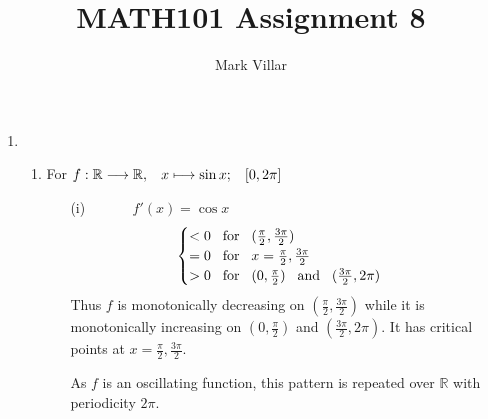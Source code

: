 \documentclass[12pt]{amsart}
\title{MATH101 Assignment 8}
\author{Mark Villar}
\begin{document}
 

\maketitle 

\begin{enumerate}
	
	\item 
	
		\begin{enumerate}
		
			\item  For $f: \mathbb{R} \longrightarrow \mathbb{R}, \hspace{0.3cm} x \longmapsto \sin x; 					\hspace{0.3cm} [0,2\pi]$
				\begin{enumerate}
					\item[(i)] $\text{ } \hspace{1cm} f'(x) = \cos x$
						\begin{align}
							\begin{cases}
								< 0 \hspace{0.3cm} \text{for} \hspace{0.3cm} (\frac{\pi}{2}, 
								\frac{3\pi}{2}) \notag \\
								= 0 \hspace{0.3cm} \text{for} \hspace{0.3cm} x=\frac{\pi}{2}, 
								\frac{3\pi}{2} \notag \\
								> 0 \hspace{0.3cm} \text{for} \hspace{0.3cm} (0, \frac{\pi}{2}) 
								\hspace{0.3cm} \text{and} \hspace{0.3cm} (\frac{3\pi}{2}, 2\pi)										\notag
							\end{cases}
						\end{align} 
						Thus $f$ is monotonically decreasing on $(\frac{\pi}{2},\frac{3\pi}{2})$ while
						it is monotonically increasing on $(0, \frac{\pi}{2})$ and $(\frac{3\pi}{2}, 2\pi)$. 
						It has critical points at $x=\frac{\pi}{2}, \frac{3\pi}{2}$. 
						
						As $f$ is an oscillating function, this pattern is repeated over $\mathbb{R}$
						with periodicity $2\pi$. \\
						

\end{enumerate}
\end{enumerate}
\end{enumerate}
\end{document}
